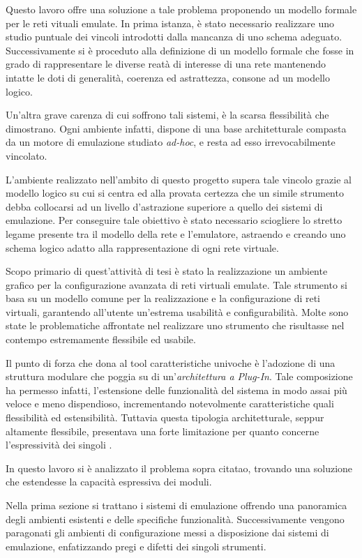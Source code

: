 Questo lavoro offre una soluzione a tale problema proponendo un modello formale per le reti vituali emulate.
In prima istanza, è stato necessario realizzare uno studio puntuale dei vincoli introdotti dalla mancanza di uno schema adeguato. Successivamente si è proceduto alla definizione di un modello formale che fosse in grado di rappresentare le diverse reatà di interesse di una rete mantenendo intatte le doti di generalità, coerenza ed astrattezza, consone ad un modello logico.

Un'altra grave carenza di cui soffrono tali sistemi, è la scarsa flessibilità che dimostrano. Ogni ambiente infatti, dispone di una base architetturale compasta da un motore di emulazione studiato \emph{ad-hoc}, e resta ad esso irrevocabilmente vincolato.

L'ambiente realizzato nell'ambito di questo progetto supera tale vincolo grazie al modello logico su cui si centra ed alla provata certezza che un simile strumento debba collocarsi ad un livello d'astrazione superiore a quello dei sistemi di emulazione.
Per conseguire tale obiettivo è stato necessario sciogliere lo stretto legame presente tra il modello della rete e l'emulatore, astraendo e creando uno schema logico adatto alla rappresentazione di ogni rete virtuale.

Scopo primario di quest'attività di tesi è stato la realizzazione un ambiente grafico per la configurazione avanzata di reti virtuali emulate.
Tale strumento si basa su un modello comune per la realizzazione e la configurazione di reti virtuali, garantendo all'utente un'estrema usabilità e configurabilità.
Molte sono state le problematiche affrontate nel realizzare uno strumento che risultasse nel contempo estremamente flessibile ed usabile.

Il punto di forza che dona al tool caratteristiche univoche è l'adozione di una struttura modulare che poggia su di un'\emph{architettura a Plug-In}. Tale composizione ha permesso infatti, l'estensione delle funzionalità del sistema in modo assai più veloce e meno dispendioso, incrementando notevolmente caratteristiche quali flessibilità ed estensibilità.
Tuttavia questa tipologia architetturale, seppur altamente flessibile, presentava una forte limitazione per quanto concerne l'espressività dei singoli \plugin{}. 

In questo lavoro si è analizzato il problema sopra citatao, trovando una soluzione che estendesse la capacità espressiva dei moduli.


Nella prima sezione si trattano i sistemi di emulazione offrendo una panoramica degli ambienti esistenti e delle specifiche funzionalità. Successivamente vengono paragonati gli ambienti di configurazione messi a disposizione dai sistemi di emulazione, enfatizzando pregi e difetti dei singoli strumenti.


